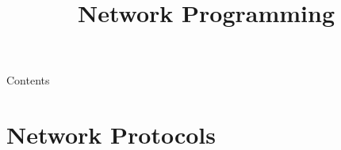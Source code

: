 
\newcommand{\topic}{%
    Network Programming
}

\usepackage{tikz}

\title{\topic}
\supertitle{\course}
\date{}



\maketitle

\begin{frame}{Contents}
	\tableofcontents
\end{frame}

\section{Network Protocols}
\subsection{}

